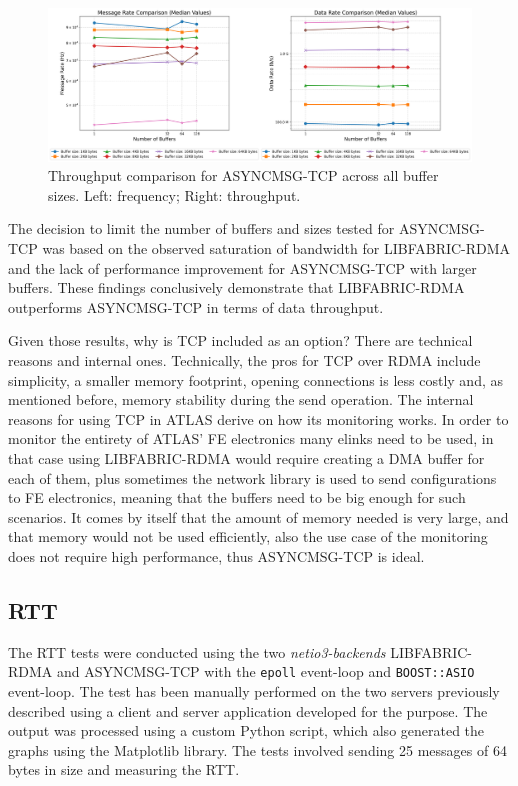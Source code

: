 \begin{figure}[htbp]
\centering
\includegraphics[width=\textwidth]{images/results/tcp_performance_comparison.png}
\caption[Throughput comparison for ASYNCMSG-TCP across all buffer sizes]{Throughput comparison for ASYNCMSG-TCP across all buffer sizes. Left: frequency; Right: throughput.}
\label{fig:tcp-mean-throughput-comparison}
\end{figure}

The decision to limit the number of buffers and sizes tested for ASYNCMSG-TCP was based on the observed saturation of bandwidth for LIBFABRIC-RDMA and the lack of performance improvement for ASYNCMSG-TCP with larger buffers. These findings conclusively demonstrate that LIBFABRIC-RDMA outperforms ASYNCMSG-TCP in terms of data throughput.

Given those results, why is TCP included as an option? There are technical reasons and internal ones. Technically, the pros for TCP over RDMA include simplicity, a smaller memory footprint, opening connections is less costly and, as mentioned before, memory stability during the send operation. 
The internal reasons for using TCP in \acs{ATLAS} derive on how its monitoring works. In order to monitor the entirety of \acs{ATLAS}' \acl{FE} electronics many elinks need to be used, in that case using LIBFABRIC-RDMA would require creating a \acs{DMA} buffer for each of them, plus sometimes the network library is used to send configurations to \acs{FE} electronics, meaning that the buffers need to be big enough for such scenarios. It comes by itself that the amount of memory needed is very large, and that memory would not be used efficiently, also the use case of the monitoring does not require high performance, thus ASYNCMSG-TCP is ideal.

\subsection{\acf{RTT}}

The \acl{RTT} tests were conducted using the two \textit{netio3-backends} LIBFABRIC-RDMA and ASYNCMSG-TCP with the \texttt{epoll} event-loop and \texttt{BOOST::ASIO} event-loop. The test has been manually performed on the two servers previously described using a client and server application developed for the purpose. The output was processed using a custom Python script, which also generated the graphs using the Matplotlib \cite{matplotlib} library. The tests involved sending 25 messages of 64 bytes in size and measuring the \acl{RTT}.

